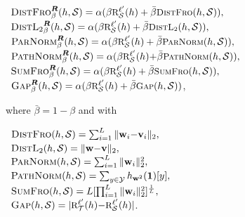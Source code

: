 \documentclass[twoside]{article}
\theoremstyle{plain}
\begin{document}
\raisebox{0.5ex}{\tiny\textbullet}~$\riskdistfro_{\beta}(h, \Scal) = {\footnotesize \alpha(\beta\RiskLossp_{\Scal}(h) + \bar{\beta}\distfro(h, \Scal))},$\\ 
\raisebox{0.5ex}{\tiny\textbullet}~$\riskdistltwo_{\beta}(h, \Scal) = {\footnotesize \alpha(\beta\RiskLossp_{\Scal}(h) + \bar{\beta}\distltwo(h, \Scal))},$\\ 
\raisebox{0.5ex}{\tiny\textbullet}~\mbox{$\riskparamnorm_{\beta}(h, \Scal) = {\footnotesize \alpha(\beta\RiskLossp_{\Scal}(h) + \bar{\beta}\paramnorm(h, \Scal))},$}\\ 
\raisebox{0.5ex}{\tiny\textbullet}~\mbox{$\riskpathnorm_{\beta}(h, \Scal)= {\footnotesize \alpha(\beta\RiskLossp_{\Scal}(h){+}\bar{\beta}\pathnorm(h, \Scal))},$}\\ 
\raisebox{0.5ex}{\tiny\textbullet}~$\risksumfro_{\beta}(h, \Scal) = {\footnotesize \alpha(\beta\RiskLossp_{\Scal}(h) + \bar{\beta}\sumfro(h, \Scal))},$\\
\raisebox{0.5ex}{\tiny\textbullet}~$\riskgap_{\beta}(h, \Scal) = {\footnotesize \alpha(\beta\RiskLossp_{\Scal}(h) + \bar{\beta}\gap(h, \Scal))}$,

where $\bar{\beta}=1-\beta$ and with 

\raisebox{0.5ex}{\tiny\textbullet}~$\text{\sc DistFro}(h, \mathcal{S}) = \sum_{i=1}^{L} \|\mathbf{w}_{i}{-}\mathbf{v}_{i}\|_{2},$\\ 
\raisebox{0.5ex}{\tiny\textbullet}~$\distltwo(h, \Scal) = {\footnotesize \|\wbf{-}\vbf\|_{2}},$\\ 
\raisebox{0.5ex}{\tiny\textbullet}~$\paramnorm(h, \Scal) = {\footnotesize \sum_{i=1}^{L}\|\wbf_{i}\|_{2}^{2}},$\\ 
\raisebox{0.5ex}{\tiny\textbullet}~\mbox{$\pathnorm(h, \Scal)= {\footnotesize \sum_{y\in\Ycal} h_{\wbf^2}(\onebf)[y]},$}\\ 
\raisebox{0.5ex}{\tiny\textbullet}~$\sumfro(h, \Scal) = {\footnotesize L{[\prod_{i=1}^{L}\|\wbf_{i}\|_{2}^{2}]^{\frac1L}}},$\\
\raisebox{0.5ex}{\tiny\textbullet}~$\gap(h, \Scal) = {\footnotesize \vert\RiskLossp_{\Tcal}(h){-}\RiskLossp_{\Scal}(h)\vert}$.
\end{document}
